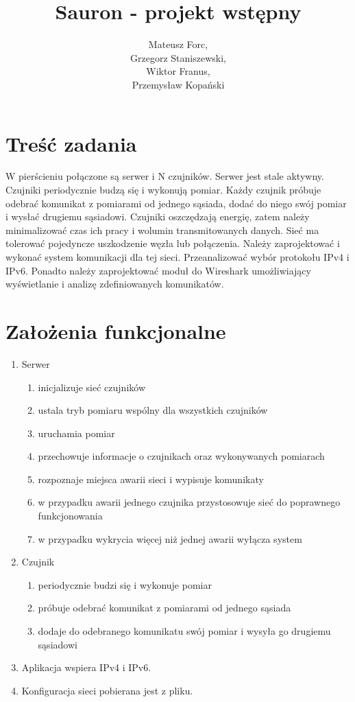 \documentclass[a4paper,11pt]{article}
\title{Sauron - projekt wstępny}
\author{Mateusz Forc, \\ Grzegorz Staniszewski, \\ Wiktor Franus, \\ Przemysław Kopański}
\begin{document}

\maketitle
\tableofcontents

\newpage
\section{Treść zadania}
W pierścieniu połączone są serwer i N czujników. Serwer jest stale aktywny. Czujniki periodycznie budzą się i wykonują pomiar. Każdy czujnik próbuje odebrać komunikat z pomiarami od jednego sąsiada, dodać do niego swój pomiar i wysłać drugiemu sąsiadowi. Czujniki oszczędzają energię, zatem należy minimalizować czas ich pracy i wolumin transmitowanych danych. Sieć ma tolerować pojedyncze uszkodzenie węzła lub połączenia. Należy zaprojektować i wykonać system komunikacji dla tej sieci. Przeanalizować wybór protokołu IPv4 i IPv6. Ponadto należy zaprojektować moduł do Wireshark umożliwiający wyświetlanie i analizę zdefiniowanych komunikatów.

\section{Założenia funkcjonalne}

\begin{enumerate}
  \item Serwer
  \begin{enumerate}
    \item inicjalizuje sieć czujników
    \item ustala tryb pomiaru wspólny dla wszystkich czujników
    \item uruchamia pomiar
    \item przechowuje informacje o czujnikach oraz wykonywanych pomiarach
    \item rozpoznaje miejsca awarii sieci i wypisuje komunikaty
    \item w przypadku awarii jednego czujnika przystosowuje sieć do poprawnego funkcjonowania
    \item w przypadku wykrycia więcej niż jednej awarii wyłącza system
  \end{enumerate}
  \item Czujnik
  \begin{enumerate}
    \item periodycznie budzi się i wykonuje pomiar
    \item próbuje odebrać komunikat z pomiarami od jednego sąsiada
    \item dodaje do odebranego komunikatu swój pomiar i wysyła go drugiemu sąsiadowi
  \end{enumerate}
  \item Aplikacja wspiera IPv4 i IPv6.
  \item Konfiguracja sieci pobierana jest z pliku.
\end{enumerate}
\end{document}

